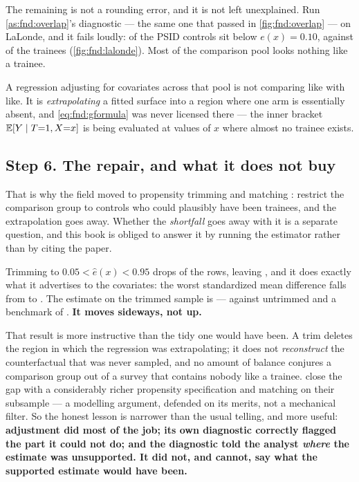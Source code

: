The remaining \usd{\nbZeroLlShortfall} is not a rounding error, and it is not left unexplained.
Run \cref{as:fnd:overlap}'s diagnostic --- the same one that passed in \cref{fig:fnd:overlap} ---
on LaLonde, and it fails loudly: \pc{\nbZeroLlCtrlLowE} of the PSID controls sit below
$e(x) = 0.10$, against \pc{\nbZeroLlTrtLowE} of the trainees (\cref{fig:fnd:lalonde}). Most of the
comparison pool looks nothing like a trainee.

A regression adjusting for covariates across that pool is not comparing like with like. It is
\emph{extrapolating} a fitted surface into a region where one arm is essentially absent, and
\cref{eq:fnd:gformula} was never licensed there --- the inner bracket
$\operatorname{\mathbb{E}}[Y \mid T{=}1, X{=}x]$ is being evaluated at values of $x$ where almost no trainee exists.



\subsection*{Step 6. The repair, and what it does not buy}

That is why the field moved to propensity trimming and matching \citep{dehejia1999}: restrict the
comparison group to controls who could plausibly have been trainees, and the extrapolation goes
away. Whether the \emph{shortfall} goes away with it is a separate question, and this book is
obliged to answer it by running the estimator rather than by citing the paper.

Trimming to $0.05 < \hat e(x) < 0.95$ drops \nbZeroLlTrimDropped{} of the \nbZeroLlN{} rows,
leaving \nbZeroLlTrimN, and it does exactly what it advertises to the covariates: the worst
standardized mean difference falls from \nbZeroLlSmdFull{} to \nbZeroLlSmdTrim. The estimate on
the trimmed sample is \usd{\nbZeroLlAdjTrim} --- against \usd{\nbZeroLlAdj} untrimmed and a
benchmark of \usd{\nbZeroLlBenchmark}. \textbf{It moves sideways, not up.}

That result is more instructive than the tidy one would have been. A trim deletes the region in
which the regression was extrapolating; it does not \emph{reconstruct} the counterfactual that
was never sampled, and no amount of balance conjures a comparison group out of a survey that
contains nobody like a trainee.  close the gap with a considerably richer
propensity specification and matching on their subsample --- a modelling argument, defended on
its merits, not a mechanical filter. So the honest lesson is narrower than the usual telling, and
more useful: \textbf{adjustment did most of the job; its own diagnostic correctly flagged the part
it could not do; and the diagnostic told the analyst \emph{where} the estimate was unsupported. It
did not, and cannot, say what the supported estimate would have been.}

